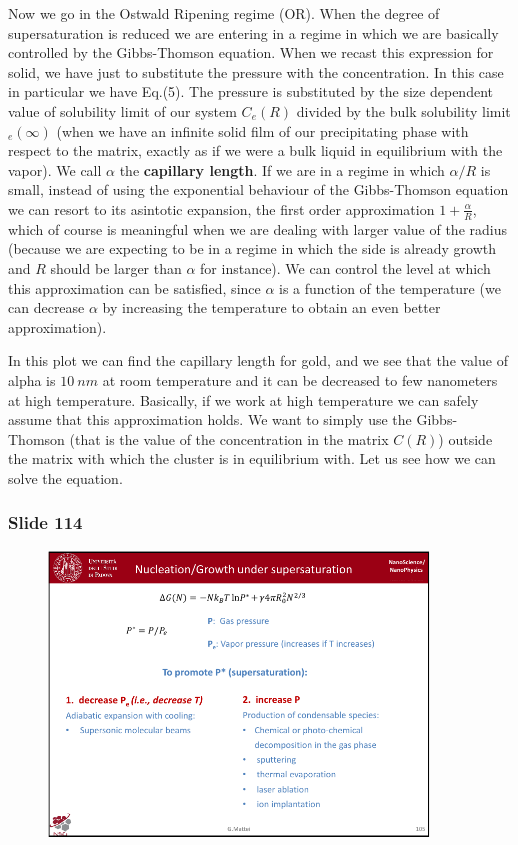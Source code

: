 \documentclass[../main/main.tex]{subfiles}
\begin{document}
Now we go in the Ostwald Ripening regime (OR). When the degree of supersaturation is reduced we are entering in a regime in which we are basically controlled by the Gibbs-Thomson equation. When we recast this expression for solid, we have just to substitute the pressure with the concentration. In this case in particular we have Eq.(5). The pressure is substituted by the size dependent value of solubility limit of our system \( C_e(R) \) divided by the bulk solubility limit \( _e (\infty ) \) (when we have an infinite solid film of our precipitating phase with respect to the matrix, exactly as if we were a bulk liquid in equilibrium with the vapor).
We call \( \alpha  \) the \textbf{capillary length}. If we are in a regime in which \( \alpha /R \) is small, instead of using the exponential behaviour of the Gibbs-Thomson equation we can resort to its asintotic expansion, the first order approximation \( 1+\frac{\alpha }{R} \), which of course is meaningful when we are dealing with larger value of the radius (because we are expecting to be in a regime in which the side is already growth and \( R \) should be larger than \( \alpha  \) for instance). We can control the level at which this approximation can be satisfied, since \( \alpha  \) is a function of the temperature (we can decrease \( \alpha  \) by increasing the temperature to obtain an even better approximation).

In this plot we can find the capillary length for gold, and we see that the value of alpha is \( \SI{10}{nm}  \) at room temperature and it can be decreased to few nanometers at high temperature. Basically, if we work at high temperature we can safely assume that this approximation holds. We want to simply use the Gibbs-Thomson (that is the value of the concentration in the matrix \( C(R) \)) outside the matrix with which the cluster is in equilibrium with.
Let us see how we can solve the equation.

\newpage

 \subsubsection{Slide 114}
 
 \begin{figure}[h!]
\centering
\includegraphics[page=10,width=0.9\textwidth]{../lessons/pdf_file/7_lesson.pdf}
\end{figure}
\end{document}
